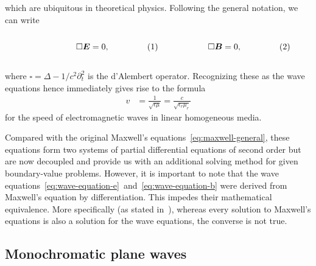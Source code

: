 \documentclass[11pt,a4paper,twoside,openany]{report}
\begin{document}
            which are ubiquitous in theoretical physics. Following the general notation, we can write\\
            \begin{subequations}
                \label{eq:wave-equations-lossless-dalembert}
                \noindent\centering
                \begin{minipage}{0.45\textwidth}
                    \begin{align}
                        \label{eq:wave-equation-e-lossless-dalembert}
                        \square\vec E &= 0,
                    \end{align}
                \end{minipage}
                \hfill
                \begin{minipage}{0.45\textwidth}
                    \begin{align}
                        \label{eq:wave-equations-b-lossless-dalembert}
                        \square\vec B &= 0,
                    \end{align}
                \end{minipage}\bigskip
            \end{subequations}\\
            where $\square = \Delta - 1/c^2\partial^2_t$ is the d'Alembert operator. Recognizing these as the wave equations hence immediately gives rise to the formula
            \begin{align}
                v &= \frac{1}{\sqrt{\epsilon\mu}} = \frac{c}{\sqrt{\epsilon_r\mu_r}}
            \end{align}
            for the speed of electromagnetic waves in linear homogeneous media.
            
            Compared with the original Maxwell's equations~\eqref{eq:maxwell-general}, these equations form two systems of partial differential equations of second order but are now decoupled and provide us with an additional solving method for given boundary-value problems. However, it is important to note that the wave equations~\eqref{eq:wave-equation-e}~and~\eqref{eq:wave-equation-b} were derived from Maxwell's equation by differentiation. This impedes their mathematical equivalence. More specifically (as stated in~\cite{griffiths:introduction-to-electrodynamics}), whereas every solution to Maxwell's equations is also a solution for the wave equations, the converse is not true.
        
        \subsection{Monochromatic plane waves}
            
\end{document}
